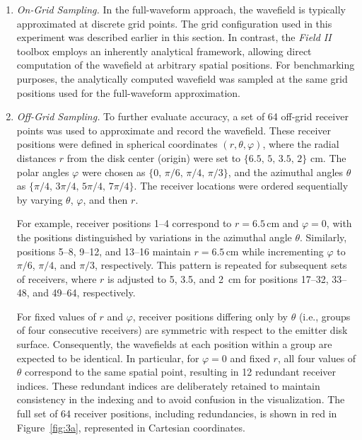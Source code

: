 \documentclass[11pt,reqno]{amsart}
\theoremstyle{remark}
\theoremstyle{italic_lemma}
\begin{document}
\begin{enumerate}
   
\item \emph{On-Grid Sampling.}  
In the full-waveform approach, the wavefield is typically approximated at discrete grid points. The grid configuration used in this experiment was described earlier in this section. In contrast, the \textit{Field II} toolbox employs an inherently analytical framework, allowing direct computation of the wavefield at arbitrary spatial positions. For benchmarking purposes, the analytically computed wavefield was sampled at the same grid positions used for the full-waveform approximation.

\item \emph{Off-Grid Sampling.}  
To further evaluate accuracy, a set of 64 off-grid receiver points was used to approximate and record the wavefield. These receiver positions were defined in spherical coordinates \( (r, \theta, \varphi) \), where the radial distances \( r \) from the disk center (origin) were set to \( \{6.5,\, 5,\, 3.5,\, 2\} \) cm. The polar angles \( \varphi \) were chosen as \( \{0,\, \pi/6,\, \pi/4,\, \pi/3\} \), and the azimuthal angles \( \theta \) as \( \{\pi/4,\, 3\pi/4,\, 5\pi/4,\, 7\pi/4\} \). The receiver locations were ordered sequentially by varying \( \theta \), \( \varphi \), and then \( r \).

For example, receiver positions 1--4 correspond to \( r = 6.5\,\text{cm} \) and \( \varphi = 0 \), with the positions distinguished by variations in the azimuthal angle \( \theta \). Similarly, positions 5--8, 9--12, and 13--16 maintain \( r = 6.5\,\text{cm} \) while incrementing \( \varphi \) to \( \pi/6 \), \( \pi/4 \), and \( \pi/3 \), respectively. This pattern is repeated for subsequent sets of receivers, where \( r \) is adjusted to 5, 3.5, and 2~cm for positions 17--32, 33--48, and 49--64, respectively.

For fixed values of \( r \) and \( \varphi \), receiver positions differing only by \( \theta \) (i.e., groups of four consecutive receivers) are symmetric with respect to the emitter disk surface. Consequently, the wavefields at each position within a group are expected to be identical. In particular, for \( \varphi = 0 \) and fixed \( r \), all four values of \( \theta \) correspond to the same spatial point, resulting in 12 redundant receiver indices. These redundant indices are deliberately retained to maintain consistency in the indexing and to avoid confusion in the visualization. The full set of 64 receiver positions, including redundancies, is shown in red in Figure~\ref{fig:3a}, represented in Cartesian coordinates.


\end{enumerate}
\end{document}
